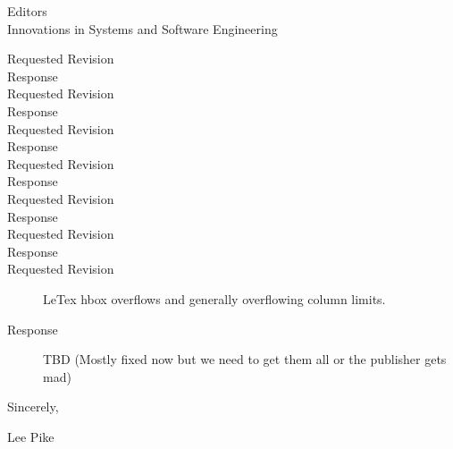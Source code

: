 \documentclass{letter}
\begin{document}
\begin{letter}{Editors \\ Innovations in Systems and Software Engineering}
\begin{description}
\item[Requested Revision]
\item[Response]
\item[Requested Revision]
\item[Response]
\item[Requested Revision]
\item[Response]
\item[Requested Revision]
\item[Response]
\item[Requested Revision]
\item[Response]
\item[Requested Revision]
\item[Response]
\item[Requested Revision] LeTex hbox overflows and generally overflowing column limits.
\item[Response] TBD (Mostly fixed now but we need to get them all or the publisher gets mad)
\end{description}
\vspace{1in}
Sincerely,

\vspace{.3in}
Lee Pike
\end{letter}
\end{document}
